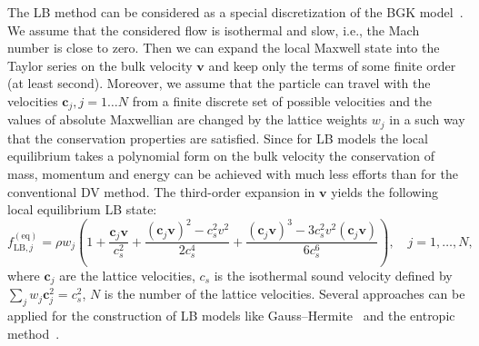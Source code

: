 \documentclass{elsarticle} %
\newcommand{\bv}{\boldsymbol{v}}
\newcommand{\bc}{\boldsymbol{c}}
\newcommand{\equil}[1]{#1^\mathrm{(eq)}}
\newcommand{\LB}{\mathrm{LB}}
\begin{document}
The LB method can be considered as a special discretization of the BGK model~\cite{Succi2001}.
We assume that the considered flow is isothermal and slow, i.e., the Mach number is close to zero. Then we can expand the local Maxwell state into the Taylor series on the bulk velocity $\bv$ and keep only the
terms of some finite order (at least second).
Moreover, we assume that the particle can travel with the velocities $\bc_{j}, j=1 \ldots N$ from a finite discrete set of possible velocities
and the values of absolute Maxwellian are changed by the lattice weights $w_j$ in a such way that  the conservation properties are satisfied. Since for LB models the local equilibrium takes a polynomial form on the bulk velocity the conservation of mass, momentum and energy can be achieved with much less efforts than for the conventional DV method.
The third-order expansion in $\bv$ yields the following local equilibrium LB state:
\begin{equation}\label{eq:lbgk}
    \equil{f}_{\LB,j} = \rho w_j\left(1+ \frac{\bc_j\bv}{c_s^2}+\frac{(\bc_j\bv)^2-c_s^2v^2}{2c_s^4}
    + \frac{(\bc_j\bv)^3-3c_s^2 v^2(\bc_j\bv)}{6c_s^6}\right), \quad j=1,\ldots,N,
\end{equation}
where $\bc_j$ are the lattice velocities, $c_s$ is the isothermal sound velocity defined by $\sum_jw_j\bc^2_j=c_s^2$,
$N$ is the number of the lattice velocities.
Several approaches can be applied for the construction of LB models like Gauss--Hermite~\cite{He1997, Shan1998, Shan2006, Shan2010}
and the entropic method~\cite{Karlin1999, Chikatamarla2006, Chikatamarla2009}.




\end{document}
